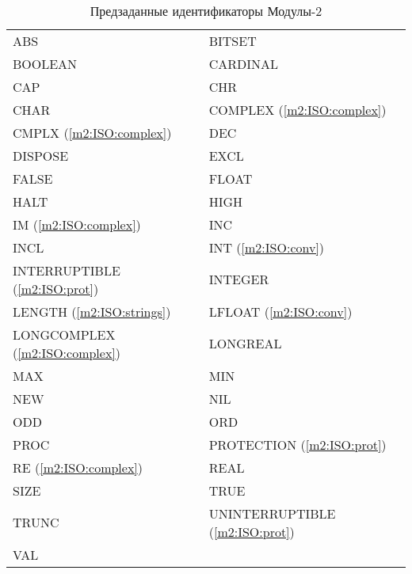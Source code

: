 \begin{table}[hbtp] \tt
\footnotesize
\begin{center}
\begin{tabular}{p{5.0cm}p{5.0cm}}
ABS             & BITSET    \\
BOOLEAN         & CARDINAL  \\
CAP             & CHR             \\
CHAR            & COMPLEX (\ref{m2:ISO:complex})  \\
CMPLX (\ref{m2:ISO:complex})  &  DEC             \\
DISPOSE         & EXCL            \\
FALSE           & FLOAT     \\
HALT            & HIGH      \\
IM (\ref{m2:ISO:complex})       & INC             \\
INCL            & INT (\ref{m2:ISO:conv})      \\
INTERRUPTIBLE (\ref{m2:ISO:prot})  & INTEGER   \\
LENGTH (\ref{m2:ISO:strings})   & LFLOAT (\ref{m2:ISO:conv})         \\
LONGCOMPLEX (\ref{m2:ISO:complex})    & LONGREAL  \\
MAX             & MIN             \\
NEW             & NIL             \\
ODD             & ORD             \\
PROC            & PROTECTION (\ref{m2:ISO:prot})     \\
RE (\ref{m2:ISO:complex})       & REAL            \\
SIZE            & TRUE      \\
TRUNC           & UNINTERRUPTIBLE (\ref{m2:ISO:prot}) \\
VAL              \\
\end{tabular}
\end{center}
\caption{Предзаданные идентификаторы Модулы-2}\label{table:m2:ISO:pervasive}
\end{table}

